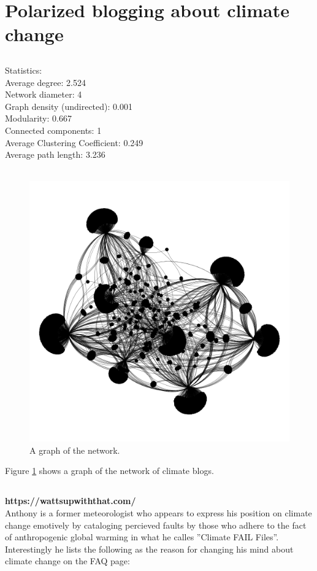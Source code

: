\documentclass[11pt]{article}
\begin{document}
\section{Polarized blogging about climate change}
\subsection{}
Statistics:\\
Average degree: \hfill 2.524\\
Network diameter: \hfill 4\\
Graph density (undirected): \hfill 0.001\\
Modularity: \hfill 0.667\\
Connected components: \hfill 1\\
Average Clustering Coefficient: \hfill 0.249\\
Average path length: \hfill 3.236\\
\\
\begin{figure}
  \includegraphics[width=\linewidth]{Figure_2.png}
  \caption{A graph of the network.}
  \label{fig:graph}
\end{figure}

Figure \ref{fig:graph} shows a graph of the network of climate blogs.

\subsection{}
\textbf{https://wattsupwiththat.com/}\\
Anthony is a former meteorologist who appears to express his position on climate
change emotively by cataloging percieved faults by those who adhere to the fact of
anthropogenic global warming in what he calles ''Climate FAIL Files''. Interestingly
he lists the following as the reason for changing his mind about climate change on
the FAQ page:
\end{document}
